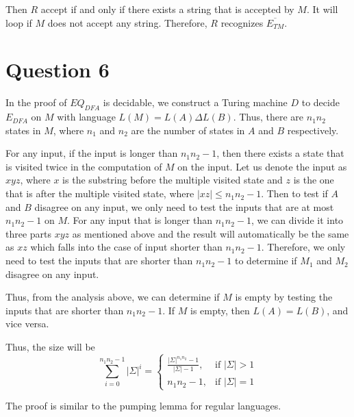 \documentclass[a4paper, UTF-8]{article}
\theoremstyle{plain}
\begin{document}
Then $R$ accept if and only if there exists a string that is accepted by $M$. It will loop if $M$ does not accept any string. Therefore, $R$ recognizes $\overline{E_{TM}}$.

\section{Question 6} 

In the proof of $EQ_{DFA}$ is decidable, we construct a Turing machine $D$ to decide $E_{DFA}$ on $M$ with language $L(M) = L(A) \Delta L(B)$. Thus, there are $n_1n_2$ states in $M$, where $n_1$ and $n_2$ are the number of states in $A$ and $B$ respectively. 

For any input, if the input is longer than $n_1n_2 - 1$, then there exists a state that is visited twice in the computation of $M$ on the input. Let us denote the input as $xyz$, where $x$ is the substring before the multiple visited state and $z$ is the one that is after the multiple visited state, where $|xz| \leq n_1n_2 - 1$. Then to test if $A$ and $B$ disagree on any input, we only need to test the inputs that are at most $n_1n_2 - 1$ on $M$. For any input that is longer than $n_1n_2 - 1$, we can divide it into three parts $xyz$ as mentioned above and the result will automatically be the same as $xz$ which falls into the case of input shorter than $n_1n_2 - 1$. Therefore, we only need to test the inputs that are shorter than $n_1n_2 - 1$ to determine if $M_1$ and $M_2$ disagree on any input. 

Thus, from the analysis above, we can determine if $M$ is empty by testing the inputs that are shorter than $n_1n_2 - 1$. If $M$ is empty, then $L(A) = L(B)$, and vice versa. 

Thus, the size will be 
$$
\sum_{i = 0}^{n_1n_2 - 1} |\Sigma|^i = \begin{cases} 
\frac{|\Sigma|^{n_1n_2} - 1}{|\Sigma| - 1}, & \text{if } |\Sigma| > 1 \\
n_1n_2 - 1, & \text{if } |\Sigma| = 1
\end{cases}
$$

The proof is similar to the pumping lemma for regular languages.
\end{document}
